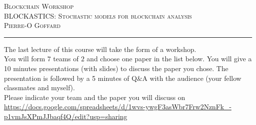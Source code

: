 \documentclass[11pt]{article}
\def\title{Blockchain Workshop}
\def\course{BLOCKASTICS: Stochastic models for blockchain analysis }
\def\profName{Pierre-O Goffard }
\begin{document}
{\center \textsc{\Large \title\\
	\large\course\\
	 \profName %
	}\\
	\vspace*{2em}
	\hrule
\vspace*{2em}}



The last lecture of this course will take the form of a workshop.\\

\noindent You will form $7$ teams of $2$ and choose one paper in the list below. You will give a 10 minutes presentations (with slides) to discuss the paper you chose. The presentation is followed by a 5 minutes of Q$\&$A with the audience (your fellow classmates and myself). 
\\

Please indicate your team and the paper you will discuss on \url{https://docs.google.com/spreadsheets/d/1wvs-ywgF3asWbr7Frw2NznFk_-p1vmJsXPmJJbaqf4Q/edit?usp=sharing}\\
\end{document}
